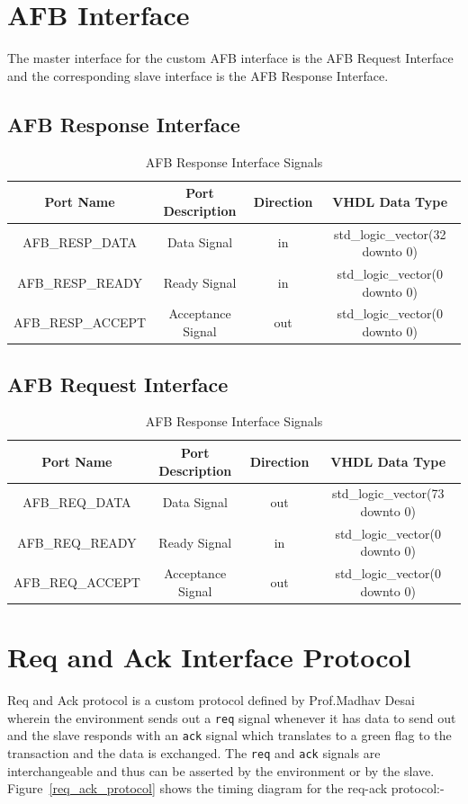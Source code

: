 \section{AFB Interface}
The master interface for the custom AFB interface is the AFB Request Interface and the corresponding slave interface is the AFB Response
Interface.


\subsection{AFB Response Interface}
\begin{table}[H]
\begin{tabular}{c | c | c | c}	
\hline
Port Name & Port Description & Direction & VHDL Data Type\\
\hline
AFB\_RESP\_DATA 	& Data Signal 	& in & std\_logic\_vector(32 downto 0) \\
AFB\_RESP\_READY 	& Ready Signal 	& in & std\_logic\_vector(0 downto 0)  \\
AFB\_RESP\_ACCEPT & Acceptance Signal & out & std\_logic\_vector(0 downto 0)  \\
\end{tabular}
\caption{AFB Response Interface Signals}
\end{table}

\subsection{AFB Request Interface}
\begin{table}[H]
\begin{tabular}{c | c | c | c}
\hline
Port Name & Port Description & Direction & VHDL Data Type\\
\hline
AFB\_REQ\_DATA 	 & Data Signal	     & out  & std\_logic\_vector(73 downto 0) \\
AFB\_REQ\_READY  & Ready Signal      & in   & std\_logic\_vector(0 downto 0)  \\
AFB\_REQ\_ACCEPT & Acceptance Signal & out  & std\_logic\_vector(0 downto 0)  \\
\end{tabular}
\caption{AFB Response Interface Signals}
\end{table}

\section{Req and Ack Interface Protocol}
Req and Ack protocol is a custom protocol defined by Prof.Madhav Desai wherein the environment sends out a \verb|req| signal whenever it has
data to send out and the slave responds with an \verb|ack| signal which translates to a green flag to the transaction and the data is
exchanged.  The \verb|req| and \verb|ack| signals are interchangeable and thus can be asserted by the environment or by the slave.
Figure~\ref{req_ack_protocol} shows the timing diagram for the req-ack protocol:-

